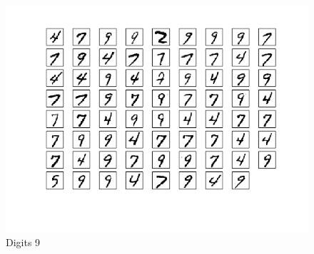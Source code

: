 \documentclass[10pt]{article}
\begin{document}
\begin{figure}
\begin{center}
\includegraphics[scale=0.5]{meansA9}
\caption{Digits 9}
\end{center}
\end{figure}

\clearpage
\end{document}
